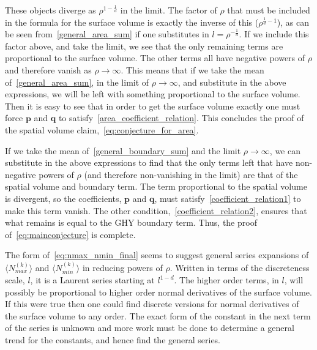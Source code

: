 \documentclass[12pt]{article}
\begin{document}
These objects diverge as $\rho^{1-\frac{1}{d}}$ in the limit. The factor of $\rho$ that must be included in the formula for the surface volume is exactly the inverse of this ($\rho^{\frac{1}{d}-1}$), as can be seen from~\eqref{general_area_sum} if one substitutes in $l=\rho^{-\frac{1}{d}}$. If we include this factor above, and take the limit, we see that the only remaining terms are proportional to the surface volume. The other terms all have negative powers of $\rho$ and therefore vanish as $\rho\rightarrow\infty$. This means that if we take the mean of~\eqref{general_area_sum}, in the limit of $\rho\rightarrow\infty$, and substitute in the above expressions, we will be left with something proportional to the surface volume. Then it is easy to see that in order to get the surface volume exactly one must force $\mathbf{p}$ and $\mathbf{q}$ to satisfy~\eqref{area_coefficient_relation}. This concludes the proof of the spatial volume claim,~\eqref{eq:conjecture_for_area}. 

If we take the mean of~\eqref{general_boundary_sum} and the limit $\rho\rightarrow\infty$, we can substitute in the above expressions to find that the only terms left that have non-negative powers of $\rho$ (and therefore non-vanishing in the limit) are that of the spatial volume and boundary term. The term proportional to the spatial volume is divergent, so the coefficients, $\mathbf{p}$ and $\mathbf{q}$, must satisfy~\eqref{coefficient_relation1} to make this term vanish. The other condition,~\eqref{coefficient_relation2}, ensures that what remains is equal to the GHY boundary term. Thus, the proof of~\eqref{eq:mainconjecture} is complete.

The form of~\eqref{eq:nmax_nmin_final} seems to suggest general series expansions of $\langle N_{max}^{(k)}\rangle$ and $\langle N_{min}^{(k)}\rangle$ in reducing powers of $\rho$. Written in terms of the discreteness scale, $l$, it is a Laurent series starting at $l^{1-d}$. The higher order terms, in $l$, will possibly be proportional to higher order normal derivatives of the surface volume. If this were true then one could find discrete versions for normal derivatives of the surface volume to any order. The exact form of the constant in the next term of the series is unknown and more work must be done to determine a general trend for the constants, and hence find the general series.
\end{document}
